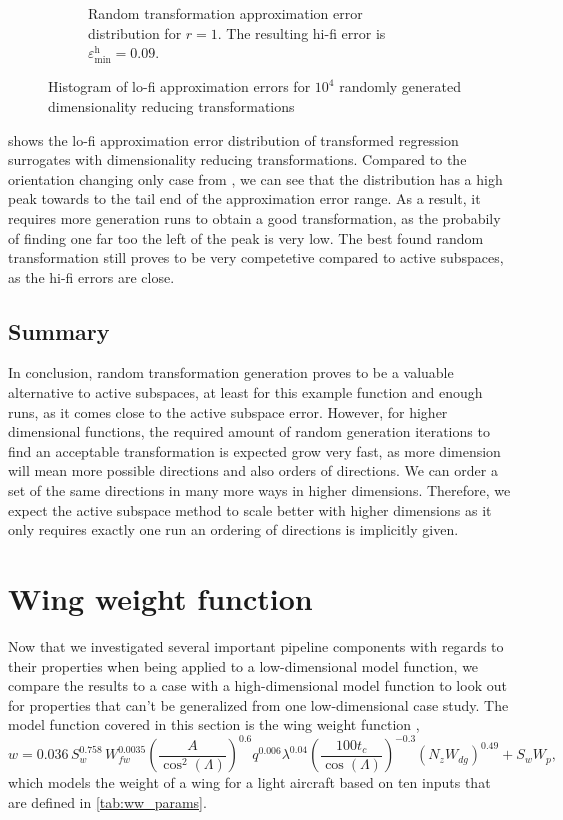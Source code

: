 \documentclass[
  a4paper,  %
  twoside,  %
  bibliography=totoc,
  headsepline,
  cleardoublepage=empty,
  parskip=half,
  draft=false
]{scrbook}
\begin{document}
\begin{mdframed}[style=style]
\begin{figure}[H]
\begin{subfigure}{.5\textwidth}
  \caption{Random transformation approximation error distribution for $r=1$. The resulting hi-fi error is $\varepsilon^\mathrm{h}_{\mathrm{min}}=0.09$.}
\vspace{3mm}
\label{fig:ishigami_hist_1}
\end{subfigure}
\delimit
\caption{Histogram of lo-fi approximation errors for $10^4$ randomly generated dimensionality reducing transformations}
\label{fig:ishigami_hist_12}
\end{figure}
\end{mdframed}
%
 shows the lo-fi approximation error distribution of transformed regression surrogates with dimensionality reducing transformations.
Compared to the orientation changing only case from , we can see that the distribution has a high peak towards to the tail end of the approximation error range.
As a result, it requires more generation runs to obtain a good transformation, as the probabily of finding one far too the left of the peak is very low.
The best found random transformation still proves to be very competetive compared to active subspaces, as the hi-fi errors are close.

\subsection{Summary}

In conclusion, random transformation generation proves to be a valuable alternative to active subspaces, at least for this example function and enough runs, as it comes close to the active subspace error.
However, for higher dimensional functions, the required amount of random generation iterations to find an acceptable transformation is expected grow very fast, as more dimension will mean more possible directions and also orders of directions.
We can order a set of the same directions in many more ways in higher dimensions.
Therefore, we expect the active subspace method to scale better with higher dimensions as it only requires exactly one run an ordering of directions is implicitly given.

\section{Wing weight function}

Now that we investigated several important pipeline components with regards to their properties when being applied to a low-dimensional model function, we compare the results to a case with a high-dimensional model function to look out for properties that can't be generalized from one low-dimensional case study.
The model function covered in this section is the wing weight function \cite{Forrester2008},
\begin{equation}
w=0.036 \, S_w^{0.758} \, W_{fw}^{0.0035} \left(\frac{A}{\cos^2(\Lambda)}\right)^{0.6} q^{0.006} \lambda^{0.04} \left( \frac{100 t_c}{\cos(\Lambda)} \right)^{-0.3} (N_z W_{dg})^{0.49} + S_w W_p,
\end{equation}
which models the weight of a wing for a light aircraft based on ten inputs that are defined in \cref{tab:ww_params}.
\end{document}
